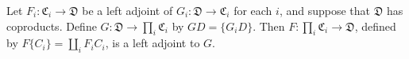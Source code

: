 Let $F_i: \mathfrak{C}_i \rightarrow \mathfrak{D}$ be a left adjoint of $G_i: \mathfrak{D} \rightarrow \mathfrak{C}_i$ for each $i$, and suppose that $\mathfrak{D}$ has coproducts. Define $G: \mathfrak{D} \rightarrow \prod_i \mathfrak{C}_i$ by $GD = \{G_i D\}$. Then $F: \prod_i \mathfrak{C}_i \rightarrow \mathfrak{D}$, defined by $F\{C_i\} = \coprod_i F_i C_i$, is a left adjoint to $G$.
